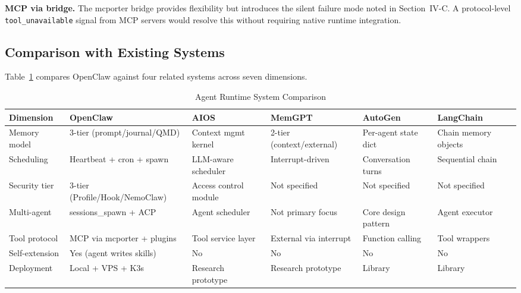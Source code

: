 \documentclass[journal]{IEEEtran}
\begin{document}
\textbf{MCP via bridge.} The mcporter bridge provides flexibility but
introduces the silent failure mode noted in Section~IV-C. A protocol-level
\texttt{tool\_unavailable} signal from MCP servers would resolve this without
requiring native runtime integration.

\subsection{Comparison with Existing Systems}

Table~\ref{tab:comparison} compares OpenClaw against four related systems
across seven dimensions.

\begin{table}[!t]
\renewcommand{\arraystretch}{1.3}
\caption{Agent Runtime System Comparison}
\label{tab:comparison}
\centering
\begin{tabular}{lp{2.4cm}p{2.0cm}p{2.0cm}p{2.0cm}p{2.0cm}}
\toprule
\textbf{Dimension} & \textbf{OpenClaw} & \textbf{AIOS~\cite{mei2024aios}} &
\textbf{MemGPT~\cite{packer2023memgpt}} & \textbf{AutoGen~\cite{wu2023autogen}} &
\textbf{LangChain~\cite{chase2022langchain}} \\
\midrule
Memory model    & 3-tier (prompt/journal/QMD) & Context mgmt kernel & 2-tier (context/external) & Per-agent state dict & Chain memory objects \\
Scheduling      & Heartbeat + cron + spawn    & LLM-aware scheduler & Interrupt-driven          & Conversation turns   & Sequential chain \\
Security tier   & 3-tier (Profile/Hook/NemoClaw) & Access control module & Not specified & Not specified & Not specified \\
Multi-agent     & sessions\_spawn + ACP       & Agent scheduler     & Not primary focus         & Core design pattern  & Agent executor \\
Tool protocol   & MCP via mcporter + plugins  & Tool service layer  & External via interrupt    & Function calling     & Tool wrappers \\
Self-extension  & Yes (agent writes skills)   & No                  & No                        & No                   & No \\
Deployment      & Local + VPS + K3s           & Research prototype  & Research prototype        & Library              & Library \\
\bottomrule
\end{tabular}
\end{table}
\end{document}
